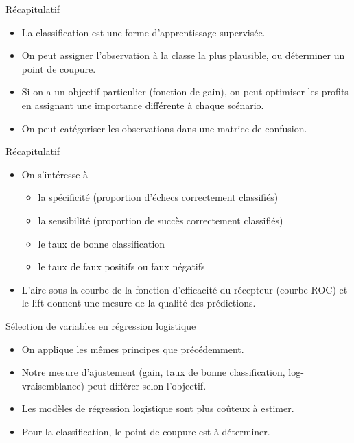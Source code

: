 \documentclass[
  ignorenonframetext,
]{beamer}
\providecommand{\tightlist}{%
  \setlength{\itemsep}{0pt}\setlength{\parskip}{0pt}}\usepackage{longtable,booktabs,array}
\begin{document}
\begin{frame}{Récapitulatif}
\label{ruxe9capitulatif}
\begin{itemize}
\tightlist
\item
  La classification est une forme d'apprentissage supervisée.
\item
  On peut assigner l'observation à la classe la plus plausible, ou
  déterminer un point de coupure.
\item
  Si on a un objectif particulier (fonction de gain), on peut optimiser
  les profits en assignant une importance différente à chaque scénario.
\item
  On peut catégoriser les observations dans une matrice de confusion.
\end{itemize}
\end{frame}

\begin{frame}{Récapitulatif}
\label{ruxe9capitulatif-1}
\begin{itemize}
\tightlist
\item
  On s'intéresse à

  \begin{itemize}
  \tightlist
  \item
    la spécificité (proportion d'échecs correctement classifiés)
  \item
    la sensibilité (proportion de succès correctement classifiés)
  \item
    le taux de bonne classification
  \item
    le taux de faux positifs ou faux négatifs
  \end{itemize}
\item
  L'aire sous la courbe de la fonction d'efficacité du récepteur (courbe
  ROC) et le lift donnent une mesure de la qualité des prédictions.
\end{itemize}
\end{frame}

\begin{frame}{Sélection de variables en régression logistique}
\label{suxe9lection-de-variables-en-ruxe9gression-logistique}
\begin{itemize}
\tightlist
\item
  On applique les mêmes principes que précédemment.
\item
  Notre mesure d'ajustement (gain, taux de bonne classification,
  log-vraisemblance) peut différer selon l'objectif.
\item
  Les modèles de régression logistique sont plus coûteux à estimer.
\item
  Pour la classification, le point de coupure est à déterminer.
\end{itemize}
\end{frame}
\end{document}
